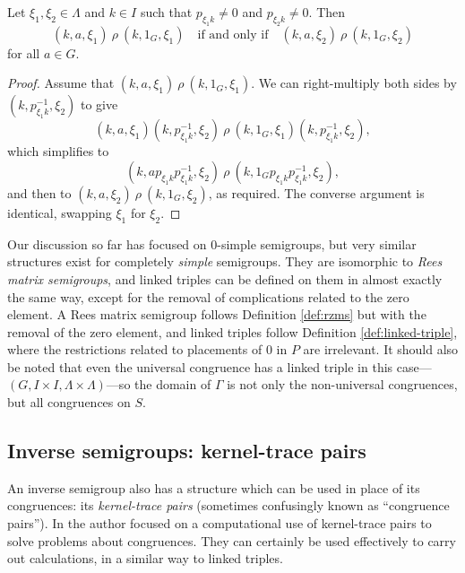 \begin{lemma}
  Let $\xi_1, \xi_2 \in \Lambda$ and $k \in I$ such that $p_{\xi_1k}^{} \neq 0$
  and $p_{\xi_2 k}^{} \neq 0$.  Then
  $$(k, a, \xi_1) ~\rho~ (k, 1_G, \xi_1)
  \quad \text{if and only if} \quad
  (k, a, \xi_2) ~\rho~ (k, 1_G, \xi_2)$$
  for all $a \in G$.
  \begin{proof}
    Assume that $(k, a, \xi_1) ~\rho~ (k, 1_G, \xi_1)$.  We can right-multiply
    both sides by $(k, p_{\xi_1k}^{-1}, \xi_2)$ to give
    $$(k, a, \xi_1)(k, p_{\xi_1k}^{-1}, \xi_2)
    ~\rho~ (k, 1_G, \xi_1)(k, p_{\xi_1k}^{-1}, \xi_2),$$
    which simplifies to
    $$(k, a p_{\xi_1k}^{} p_{\xi_1k}^{-1}, \xi_2)
    ~\rho~ (k, 1_G p_{\xi_1k}^{} p_{\xi_1k}^{-1}, \xi_2),$$
    and then to
    $(k, a, \xi_2) ~\rho~ (k, 1_G, \xi_2)$,
    as required.
    The converse argument is identical, swapping $\xi_1$ for $\xi_2$.
  \end{proof}
\end{lemma}

Our discussion so far has focused on 0-simple semigroups, but very similar
structures exist for completely \textit{simple} semigroups.  They are isomorphic
to \textit{Rees matrix semigroups}, and linked triples can be defined on them in
almost exactly the same way, except for the removal of complications related to
the zero element.  A Rees matrix semigroup follows Definition \ref{def:rzms} but
with the removal of the zero element, and linked triples follow Definition
\ref{def:linked-triple}, where the restrictions related to placements of $0$ in
$P$ are irrelevant.  It should also be noted that even the universal congruence
has a linked triple in this
case---$(G, I \times I, \Lambda \times \Lambda)$---so the domain of $\Gamma$ is
not only the non-universal congruences, but all congruences on $S$.

\subsection{Inverse semigroups: kernel-trace pairs}
\label{sec:kertr}

An inverse semigroup also has a structure which can be used in place of its
congruences: its \textit{kernel-trace pairs} (sometimes confusingly known as
``congruence pairs'').  In \cite[Chapter 5]{mtorpey_msc} the author focused on a
computational use of kernel-trace pairs to solve problems about congruences.
They can certainly be used effectively to carry out calculations, in a similar
way to linked triples.


